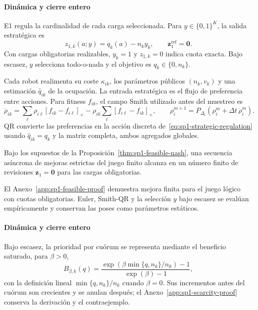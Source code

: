 \paragraph{Dinámica y cierre entero}

E1 regula la cardinalidad de cada carga seleccionada. Para \(y\in\{0,1\}^K\), la salida estratégica es
\begin{equation}
 z_{1,k}(a;y)=q_k(a)-n_ky_k,
 \qquad \boldsymbol z_1^{\mathrm{ref}}=\boldsymbol0.
 \label{eq:sp1-strategic-regulation}
\end{equation}
Con cargas obligatorias realizables, $y_k=1$ y $z_{1,k}=0$ indica cuota exacta. Bajo escasez, $y$ selecciona todo-o-nada y el objetivo es $q_k\in\{0,n_k\}$.

Cada robot realimenta su coste $\kappa_{ik}$, los parámetros públicos $(n_k,v_k)$ y una estimación $\widehat q_{ik}$ de la ocupación. La entrada estratégica es el flujo de preferencia entre acciones. Para fitness $f_{ik}$, el campo Smith utilizado antes del muestreo es
\begin{equation}
 \dot\rho_{ik}=
 \sum_{\ell}\rho_{i\ell}[f_{ik}-f_{i\ell}]_+
 -\rho_{ik}\sum_{\ell}[f_{i\ell}-f_{ik}]_+,
 \qquad
 \rho_i^{m+1}=P_{\Delta_i}\!\left(\rho_i^m+\Delta t\,\dot\rho_i^m\right).
 \label{eq:sp1-smith-feedback}
\end{equation}
QR convierte las preferencias en la acción discreta de~\eqref{eq:sp1-strategic-regulation} usando \(\widehat q_{ik}=q_k\) y la matriz completa, ambos agregados globales.

\begin{corolario}
\label{cor:sp1-strategic-regulation}
Bajo los supuestos de la Proposición~\ref{thm:sp1-feasible-nash}, una secuencia asíncrona de mejoras estrictas del juego finito alcanza en un número finito de revisiones $\boldsymbol z_1=\boldsymbol0$ para las cargas obligatorias.
\end{corolario}
El Anexo~\ref{app:sp1-feasible-proof} demuestra mejora finita para el juego lógico con cuotas obligatorias. Euler, Smith-QR y la selección \(y\) bajo escasez se evalúan empíricamente y conservan las poses como parámetros estáticos.
\fi

\paragraph{Dinámica y cierre entero}

Bajo escasez, la prioridad por cuórum se representa mediante el beneficio saturado, para $\beta>0$,
\begin{equation}
 B_{\beta,k}(q)=\frac{\exp\!\left(\beta\min\{q,n_k\}/n_k\right)-1}{\exp(\beta)-1},
 \label{eq:sp1-quorum-benefit}
\end{equation}
con la definición lineal $\min\{q,n_k\}/n_k$ cuando $\beta=0$. Sus incrementos antes del cuórum son crecientes y se anulan después; el Anexo~\ref{app:sp1-scarcity-proof} conserva la derivación y el contraejemplo.

